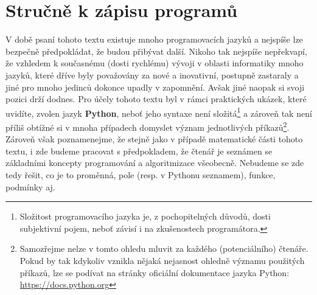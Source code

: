\section{Stručně k zápisu programů}\label{sec:zapis-programu}

V době psaní tohoto textu existuje mnoho programovacích jazyků a nejspíše lze bezpečně předpokládat, že budou přibývat další. Nikoho tak nejspíše nepřekvapí, že vzhledem k současnému (dosti rychlému) vývoji v oblasti informatiky mnoho jazyků, které dříve byly považovány za nové a inovativní, postupně zastaraly a jiné pro mnoho jedinců dokonce upadly v zapomnění. Avšak jiné naopak si svoji pozici drží dodnes. Pro účely tohoto textu byl v rámci praktických ukázek, které uvidíte, zvolen jazyk \textbf{Python}, neboť jeho syntaxe není složitá\footnote{Složitost programovacího jazyka je, z pochopitelných důvodů, dosti subjektivní pojem, neboť závisí i na zkušenostech programátora.} a zároveň tak není příliš obtížné si v mnoha případech domyslet význam jednotlivých příkazů\footnote{Samozřejme nelze v tomto ohledu mluvit za každého (potenciálního) čtenáře. Pokud by tak kdykoliv vznikla nějaká nejasnost ohledně významu použitých příkazů, lze se podívat na stránky oficiální dokumentace jazyka Python: \url{https://docs.python.org}}. Zároveň však poznamenejme, že stejně jako v případě matematické části tohoto textu, i zde budeme pracovat s předpokladem, že čtenář je seznámen se základními koncepty programování a algoritmizace všeobecně. Nebudeme se zde tedy řešit, co je to proměnná, pole (resp. v Pythonu seznamem), funkce, podmínky aj.

